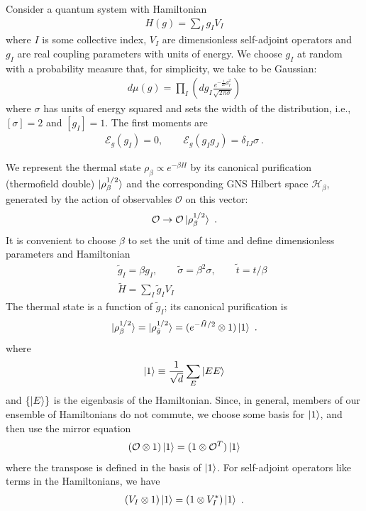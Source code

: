 \documentclass{article}
\theoremstyle{definition}
\newcommand{\nn}{\nonumber}
\newcommand{\lb}{\left(}
\newcommand{\rb}{\right)}
\newcommand{\mO}{\mathcal{O}}
\begin{document}
    Consider a quantum system with Hamiltonian
    \begin{eqnarray}
        H(g)=\sum_I g_I V_I
    \end{eqnarray}
    where $I$ is some collective index, $V_{I}$ are dimensionless self-adjoint operators and $g_{I}$ are real
    coupling parameters with units of energy. We choose $g_{I}$ at random with a
    probability measure that, for simplicity, we take to be Gaussian:
    \begin{eqnarray}
        d\mu(g)= \prod_I\lb dg_I
        \frac{e^{-\frac{1}{2\sigma} g_I^2}}{\sqrt{2\pi \sigma}} \rb
    \end{eqnarray}
    where $\sigma$ has units of energy squared and sets the width of the
    distribution, i.e., $[\sigma]=2$ and $[g_{I}]=1$. The first moments are
    \begin{eqnarray}
        \mathcal{E}_g(g_I)=0, \qquad \mathcal{E}_g(g_I g_J)=\delta_{IJ}\sigma\ .
    \end{eqnarray}

    We represent the thermal state $\rho_{\beta}\propto e^{-\beta H}$ by its canonical
    purification (thermofield double) $\ket{\rho_\beta^{1/2}}$ and the corresponding
    GNS Hilbert space $\mathcal{H}_{\beta}$, generated by the action of
    observables $\mO$ on this vector:
    \begin{eqnarray}
        \mO\to \mO\ket{\rho_\beta^{1/2}}\ .
    \end{eqnarray}
    It is convenient to choose $\beta$ to set the unit of time and define dimensionless
    parameters and Hamiltonian
    \begin{eqnarray}
        &&\tilde{g}_I=\beta g_I,\qquad \tilde{\sigma}=\beta^2 \sigma, \qquad
        \tilde{t}=t/\beta\nn\\
        &&\tilde{H}=\sum_I \tilde{g}_I V_I
    \end{eqnarray}
    The thermal state is a function of $\tilde{g}_{I}$; its canonical
    purification is
    \begin{eqnarray}
        \ket{\rho_\beta^{1/2}}=\ket{\rho_{\tilde{g}}^{1/2}}=(e^{-\tilde{H}/2}\otimes
        1)\ket{1}\ .
    \end{eqnarray}
    where
    \begin{eqnarray}
        \ket{1}\equiv \frac{1}{\sqrt{d}}\sum_E \ket{E E}
    \end{eqnarray}
    and $\{\ket{E}\}$ is the eigenbasis of the Hamiltonian. Since, in general, members
    of our ensemble of Hamiltonians do not commute, we choose some basis for
    $\ket{1}$, and then use the mirror equation
    \begin{eqnarray}
        (\mathcal{O}\otimes 1)\ket{1}=(1\otimes \mathcal{O}^T)\ket{1}
    \end{eqnarray}
    where the transpose is defined in the basis of $\ket{1}$. For self-adjoint
    operators like terms in the Hamiltonians, we have
    \begin{eqnarray}
        (V_I\otimes 1)\ket{1}=(1\otimes V_I^*)\ket{1}\ .
    \end{eqnarray}
\end{document}
